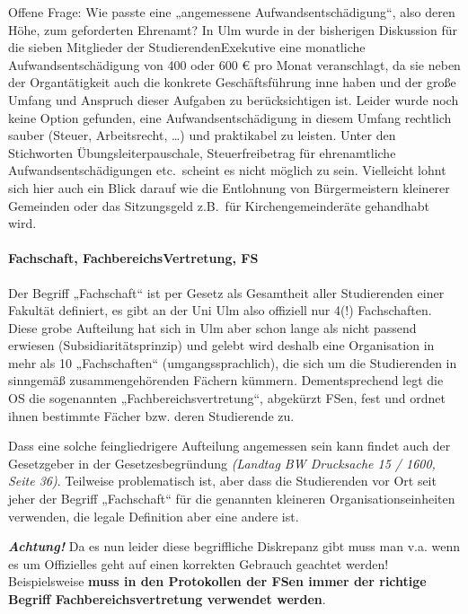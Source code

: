 \documentclass[
10pt,
a4paper,
twoside,								%
titlepage=false,							%
draft=false								%
]{scrartcl}
\begin{document}
Offene Frage: Wie passte eine „angemessene Aufwandsentschädigung“, also deren Höhe, zum geforderten Ehrenamt? In Ulm wurde in der bisherigen Diskussion für die sieben Mitglieder der StudierendenExekutive eine monatliche Aufwandsentschädigung von 400 oder 600 € pro Monat veranschlagt, da sie neben der Organtätigkeit auch die konkrete Geschäftsführung inne haben und der große Umfang und Anspruch dieser Aufgaben zu berücksichtigen ist. Leider wurde noch keine Option gefunden, eine Aufwandsentschädigung in diesem Umfang rechtlich sauber (Steuer, Arbeitsrecht, …) und praktikabel zu leisten. Unter den Stichworten Übungsleiterpauschale, Steuerfreibetrag für ehrenamtliche Aufwandsentschädigungen etc.~scheint es nicht möglich zu sein. Vielleicht lohnt sich hier auch ein Blick darauf wie die Entlohnung von Bürgermeistern kleinerer Gemeinden oder das Sitzungsgeld z.B.~für Kirchengemeinderäte gehandhabt wird.



\paragraph{Fachschaft, FachbereichsVertretung, FS}\label{Glossar: Fachschaft, Fachbereichsvertretung, FS}

Der Begriff „Fachschaft“ ist per Gesetz als Gesamtheit aller Studierenden einer Fakultät definiert, es gibt an der Uni Ulm also offiziell nur 4(!) Fachschaften.
Diese grobe Aufteilung hat sich in Ulm aber schon lange als nicht passend erwiesen (Subsidiaritätsprinzip) und gelebt wird deshalb eine Organisation in mehr als 10 „Fachschaften“ (umgangssprachlich), die sich um die Studierenden in sinngemäß zusammengehörenden Fächern kümmern.
Dementsprechend legt die OS die sogenannten „Fachbereichsvertretung“, abgekürzt FSen, fest und ordnet ihnen bestimmte Fächer bzw. deren Studierende zu.

Dass eine solche feingliedrigere Aufteilung angemessen sein kann findet auch der Gesetzgeber in der Gesetzesbegründung \textit{(Landtag BW Drucksache 15 / 1600, Seite 36)}.
Teilweise problematisch ist, aber dass die Studierenden vor Ort seit jeher der Begriff „Fachschaft“ für die genannten kleineren Organisationseinheiten verwenden, die legale Definition aber eine andere ist.

\textbf{\emph{Achtung!}} Da es nun leider diese begriffliche Diskrepanz gibt muss man v.a. wenn es um Offizielles geht auf einen korrekten Gebrauch geachtet werden! Beispielsweise \textbf{muss in den Protokollen der FSen immer der richtige Begriff Fachbereichsvertretung verwendet werden}.
\end{document}
